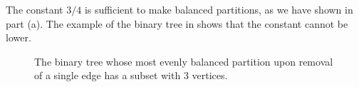 The constant $3/4$ is sufficient to make balanced partitions, as we have shown in part (a).
The example of the binary tree in  shows that the constant cannot be lower.
\begin{figure}[htb]
    
    \caption{The binary tree whose most evenly balanced partition upon removal of a single edge has a subset with 3 vertices.} \label{fig:B-3b}
\end{figure}
